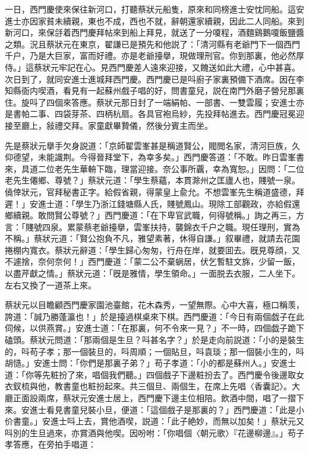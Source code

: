 一日，西門慶使來保往新河口，打聽蔡狀元船隻，原來和同榜進士安忱同船。這安進士亦因家貧未續親，東也不成，西也不就，辭朝還家續親，因此二人同船。來到新河口，來保㧱着西門慶拜帖來到船上拜見，就送了一分嗄程，酒麵鷄鵝嗄飯鹽醬之類。況且蔡狀元在東京，翟謙已是預先和他説了：「清河縣有老爺門下一個西門千户，乃是大巨家，富而好禮。亦是老爺擡擧，現做理刑官。你到那裏，他必然厚侍。」這蔡狀元牢記在心。見西門慶差人遠來迎接，又餽送如此大禮，心中甚喜。次日到了，就同安進士進城拜西門慶。西門慶已是呌廚子家裏預備下酒席。因在李知縣衙内喫酒，看見有一起蘇州戲子唱的好，問書童兒，説在南門外磨子營兒那裏住。旋呌了四個來答應。蔡狀元那日封了一端絹帕、一部書、一雙雲履；安進士亦是書帕二事、四袋芽茶、四柄杭扇。各具官袍烏紗，先投拜帖進去。西門慶冠冕迎接至廳上，敍禮交拜。家童獻畢贄儀，然後分賓主而坐。

先是蔡狀元擧手欠身説道：「京師翟雲峯甚是稱道賢公，閥閲名家，清河巨族，久仰德望，未能識荆。今得晉拜堂下，為幸多矣。」西門慶答道：「不敢。昨日雲峯書來，具道二位老先生華輈下臨，理當迎接。奈公事所覊，幸為寬恕。」因問：「二位老先生僊鄉、尊號？」蔡狀元道：「學生蔡蘊，本貫滁州之匡廬人也，賤號一泉。僥倖狀元，官拜秘書正字。給假省親，得蒙皇上兪允。不想雲峯先生稱道盛德，拜遲！」安進士道：「學生乃浙江錢塘縣人氏，賤號鳳山。現除工部觀政，亦給假還鄉續親。敢問賢公尊號？」西門慶道：「在下卑官武職，何得號稱。」詢之再三，方言：「賤號四泉。累蒙蔡老爺擡擧，雲峯扶持，襲錦衣千户之職。現任理刑，實為不稱。」蔡狀元道：「賢公抱負不凡，雅望素著，休得自謙。」叙畢禮，就請去花園捲棚内寬衣。蔡狀元辭道：「學生歸心匆匆，行舟在岸，就要囬去。旣見尊顔，又不遽捨，奈何奈何！」西門慶道：「蒙二公不棄蜗居，伏乞暫駐文旆，少留一飯，以盡芹獻之情。」蔡狀元道：「旣是雅情，學生領命。」一面脱去衣服，二人坐下。左右又換了一道茶上來。

蔡狀元以目瞻顧西門慶家園池臺館，花木森秀，一望無際。心中大喜，極口稱羡，誇道：「誠乃勝蓬瀛也！」於是擡過棋桌來下棋。西門慶道：「今日有兩個戯子在此伺候，以供燕賞。」安進士道：「在那裏，何不令來一見？」不一時，四個戯子跪下磕頭。蔡狀元問道：「那兩個是生旦？呌甚名字？」於是走向前説道：「小的是裝生的，呌苟子孝；那一個裝旦的，呌周順；一個貼旦，呌袁琰；那一個裝小生的，呌胡慥。」安進士問：「你們是那裏子弟？」苟子孝道：「小的都是蘇州人。」安進士道：「你等先粧扮了來，唱個我們聽。」四個戲子下邊粧扮去了。西門慶令後邊取女衣釵梳與他，教書童也粧扮起來。共三個旦、兩個生，在席上先唱〈香囊記〉。大廳正面設兩席，蔡狀元安進士居上，西門慶下邊主位相陪。飲酒中間，唱了一摺下來。安進士看見書童兒裝小旦，便道：「這個戲子是那裏的？」西門慶道：「此是小价書童。」安進士呌上去，賞他酒喫，説道：「此子絶妙，而無以加矣！」蔡狀元又呌別的生旦過來，亦賞酒與他喫。因吩咐：「你唱個〈朝元歌〉『花邊柳邊』。」苟子孝答應，在旁拍手唱道：

